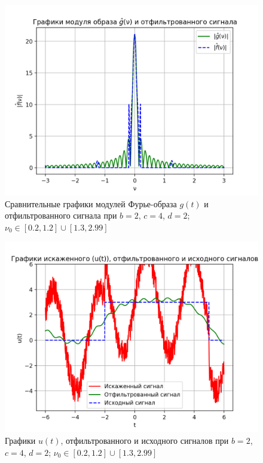\begin{figure}[ht!]
    \centering
    \includegraphics[scale=0.55]{media/1 task/specific_freq/Fourier_Image_Comparison_2_4_2_-1,2_-0,2_-2,99_-2,7_-2,7_-1,3.png}
    \caption{Сравнительные графики модулей Фурье-образа $g(t)$ и отфильтрованного сигнала при $b=2$, $c=4$, $d=2$; $\nu_0 \in [0.2, 1.2] \cup [1.3, 2.99]$}
    \label{fig:fourc_2_4_2_6}
\end{figure}

\begin{figure}[ht!]
    \centering
    \includegraphics[scale=0.65]{media/1 task/specific_freq/Cleaned_2_4_2_-1,2_-0,2_-2,99_-2,7_-2,7_-1,3.png}
    \caption{Графики  $u(t)$, отфильтрованного и исходного сигналов при $b=2$, $c=4$, $d=2$; $\nu_0 \in [0.2, 1.2] \cup [1.3, 2.99]$}
    \label{fig:cleaned_2_4_2_6}
\end{figure}

